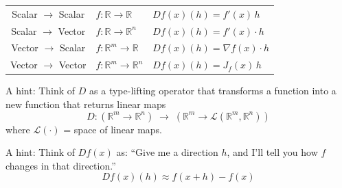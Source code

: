 \vspace{5mm}

\begin{center}
  \begin{tabular}{ c l l }
    Scalar \(\to\) Scalar & \(f : \mathbb{R}\to \mathbb{R}\)          & \(Df(x)(h) = f'(x)\,h\)            \\
    Scalar \(\to\) Vector & \(f : \mathbb{R}\to \mathbb{R}^{n}\)      & \(Df(x)(h) = f'(x) \cdot h\)       \\
    Vector \(\to\) Scalar & \(f : \mathbb{R}^{m} \to \mathbb{R}\)     & \(Df(x)(h) = \nabla f(x) \cdot h\) \\
    Vector \(\to\) Vector & \(f : \mathbb{R}^{m} \to \mathbb{R}^{n}\) & \(Df(x)(h) = J_{f}(x)\,h\)
  \end{tabular}
\end{center}

\vspace{5mm}

A hint: Think of \(D\) as a type-lifting operator that transforms a function into a new function that returns linear maps
\[ D : ( \mathbb{R}^{m} \to \mathbb{R}^{n} ) \;\to\; ( \mathbb{R}^{m} \to \mathcal{L}(\mathbb{R}^{m}, \mathbb{R}^{n}) ) \]
where \(\mathcal{L}(\cdot)\) = space of linear maps.

\vspace{5mm}

A hint: Think of \(Df(x)\) as: ``Give me a direction \(h\), and I'll tell you how \(f\) changes in that direction.''
\[ Df(x)(h) \approx f(x + h) - f(x) \]
